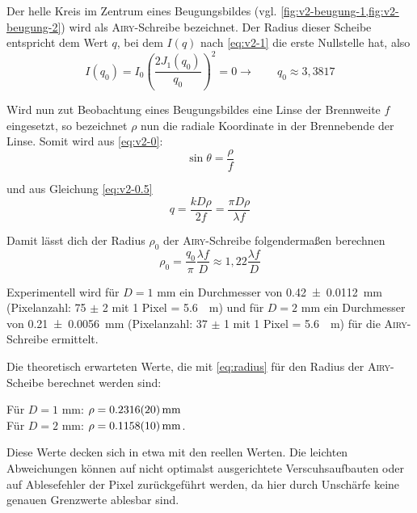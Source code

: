 \documentclass[../protokoll.tex]{subfiles}
\begin{document}
Der helle Kreis im Zentrum eines Beugungsbildes (vgl. \cref{fig:v2-beugung-1,fig:v2-beugung-2}) wird als \textsc{Airy}-Schreibe bezeichnet.
Der Radius dieser Scheibe entspricht dem Wert $q$, bei dem $I(q)$ nach \cref{eq:v2-1} die erste Nullstelle hat, also
\begin{equation}
    I(q_0) = I_0 \left( \dfrac{2 J_1(q_0)}{q_0} \right)^2 = 0 \to \qquad q_0 \approx 3,3817
\end{equation}

Wird nun zut Beobachtung eines Beugungsbildes eine Linse der Brennweite $f$ eingesetzt, so bezeichnet $\rho$ nun die radiale
Koordinate in der Brennebende der Linse. Somit wird aus \cref{eq:v2-0}:
\begin{equation}
    \sin \theta = \dfrac{\rho}{f}
\end{equation}

und aus Gleichung \cref{eq:v2-0.5}
\begin{equation}
    q = \dfrac{k D \rho}{2 f} = \dfrac{\pi D \rho}{\lambda f}
\end{equation}

Damit lässt dich der Radius $\rho_0$ der \textsc{Airy}-Schreibe folgendermaßen berechnen
\begin{equation}\label{eq:radius}
    \rho_0 = \dfrac{q_0}{\pi} \dfrac{\lambda f }{D} \approx 1,22 \dfrac{\lambda f}{D}
\end{equation}

Experimentell wird für $D = 1$ mm ein Durchmesser von \qty{0.42 \pm 0.0112}{\mm} (Pixelanzahl: 75 $\pm$ 2 mit 1 Pixel = \qty{5.6}{\mu\meter})
und für $D = 2$ mm ein Durchmesser von \qty{0.21 \pm 0.0056}{\mm} (Pixelanzahl: 37 $\pm$ 1 mit 1 Pixel = \qty{5.6}{\mu\meter}) für die \textsc{Airy}-Schreibe ermittelt.

Die theoretisch erwarteten Werte, die mit \cref{eq:radius} für den Radius der \textsc{Airy}-Scheibe
berechnet werden sind:

Für $D = 1$ mm: \quad $\rho = \qty{0.2316 \pm 0.002}{\mm}$ \\
Für $D = 2$ mm: \quad $\rho = \qty{0.1158 \pm 0.001}{\mm}$.

Diese Werte decken sich in etwa mit den reellen Werten. Die leichten Abweichungen können auf
nicht optimalst ausgerichtete Verscuhsaufbauten oder auf Ablesefehler der Pixel zurückgeführt
werden, da hier durch Unschärfe keine genauen Grenzwerte ablesbar sind.
\end{document}
